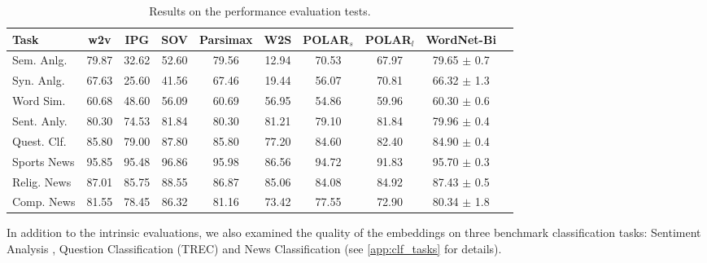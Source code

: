 \documentclass[11pt,a4paper]{article}
\begin{document}
\begin{table}
    \centering
	\begin{tabular}{lccccccccc}
		\hline \hline 
		\textbf{Task} & \textbf{w2v} & \textbf{IPG} & \textbf{SOV} & \textbf{Parsimax} & \textbf{W2S} & \textbf{POLAR$_s$} & \textbf{POLAR$_l$} & \textbf{WordNet-Bi} \\ \hline \hline %
	    Sem. Anlg. & 79.87 & 32.62 & 52.60 & 79.56 & 12.94 & 70.53 & 67.97 & 79.65 $\pm$ 0.7 \\
	    Syn. Anlg. & 67.63 & 25.60 & 41.56 & 67.46 & 19.44 & 56.07 & 70.81 & 66.32 $\pm$ 1.3 \\ 
	    \hline %
	    Word Sim. & 60.68 & 48.60 & 56.09 & 60.69 & 56.95 & 54.86 & 59.96 & 60.30 $\pm$ 0.6 \\
	    \hline %
	    Sent. Anly. & 80.30 & 74.53 & 81.84 & 80.30 & 81.21 & 79.10 & 81.84 & 79.96 $\pm$ 0.4 \\ \hline %
	    Quest. Clf. & 85.80 & 79.00 & 87.80 & 85.80 & 77.20 & 84.60 & 82.40 & 84.90 $\pm$ 0.4 \\ \hline %
	    Sports News & 95.85 & 95.48 & 96.86 & 95.98 & 86.56 & 94.72 & 91.83 & 95.70 $\pm$ 0.3 \\
	    Relig. News & 87.01 & 85.75 & 88.55 & 86.87 & 85.06 & 84.08 & 84.92 & 87.43 $\pm$ 0.5 \\
	    Comp. News & 81.55 & 78.45 & 86.32 & 81.16 & 73.42 & 77.55 & 72.90 & 80.34 $\pm$ 1.8 \\ \hline \hline %
	\end{tabular}
	\caption{ Results on the performance evaluation tests. }
	\label{tab:performance_tests}
\end{table}

In addition to the intrinsic evaluations, we also examined the quality of the embeddings on three benchmark classification tasks: Sentiment Analysis \citep{socher13treebank}, Question Classification (TREC) \citep{li06learning} and News Classification \citep{faruqui15sparse} (see \ref{app:clf_tasks} for details). 
\end{document}
